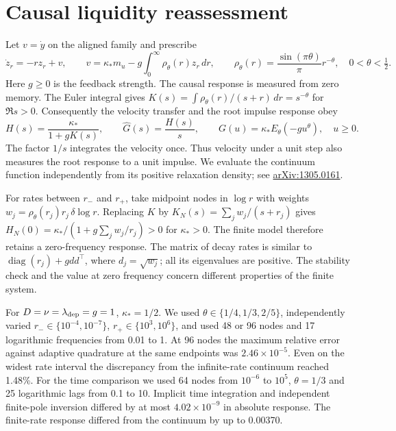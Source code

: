 \documentclass[11pt]{article}
\begin{document}
\section{Causal liquidity reassessment}
Let \(v=\dot y\) on the aligned family and prescribe
\[
 \dot z_r=-rz_r+v,\qquad v=\kappa_*m_u-g\int_0^\infty \rho_\theta(r)z_r\,dr,
 \qquad \rho_\theta(r)=\frac{\sin(\pi\theta)}{\pi}r^{-\theta},
 \quad 0<\theta<\tfrac12 .
\]
Here \(g\ge0\) is the feedback strength. The causal response is measured
from zero memory. The Euler integral gives
\(K(s)=\int\rho_\theta(r)/(s+r)\,dr=s^{-\theta}\) for \(\Re s>0\).
Consequently the velocity transfer and the root impulse response obey
\begin{equation}
 H(s)=\frac{\kappa_*}{1+gK(s)},\qquad
 \widehat G(s)=\frac{H(s)}{s},\qquad
 G(u)=\kappa_* E_\theta(-gu^\theta),\quad u\ge0 .
 \label{eq:feedback}
\end{equation}
The factor \(1/s\) integrates the velocity once. Thus velocity under a
unit step also measures the root response to a unit impulse. We evaluate
the continuum function independently from its positive relaxation density;
see \href{https://arxiv.org/abs/1305.0161}{arXiv:1305.0161}.

For rates between \(r_-\) and \(r_+\), take midpoint nodes in \(\log r\)
with weights \(w_j=\rho_\theta(r_j)r_j\,\delta\log r\).
Replacing \(K\) by \(K_N(s)=\sum_jw_j/(s+r_j)\) gives
\(H_N(0)=\kappa_* /(1+g\sum_j w_j/r_j)>0\) for \(\kappa_*>0\).
The finite model therefore retains a zero-frequency response. The matrix
of decay rates is similar to \(\operatorname{diag}(r_j)+g dd^\top\),
where \(d_j=\sqrt{w_j}\); all its eigenvalues are positive.
The stability check and the value at zero frequency concern different
properties of the finite system.

For \(D=\nu=\lambda_{\rm dep}=g=1\), \(\kappa_*=1/2\). We used
\(\theta\in\{1/4,1/3,2/5\}\), independently varied \(r_-\in\{10^{-4},10^{-7}\}\),
\(r_+\in\{10^3,10^6\}\), and used 48 or 96 nodes and 17 logarithmic
frequencies from 0.01 to 1. At 96 nodes the maximum relative error against
adaptive quadrature at the same endpoints was \(2.46\times10^{-5}\).
Even on the widest rate interval the discrepancy from the infinite-rate
continuum reached 1.48\%. For the time comparison we used 64 nodes from
\(10^{-6}\) to \(10^5\), \(\theta=1/3\) and 25 logarithmic lags from
0.1 to 10. Implicit time integration and independent finite-pole inversion
differed by at most \(4.02\times10^{-9}\) in absolute response. The
finite-rate response differed from the continuum by up to 0.00370.
\end{document}
